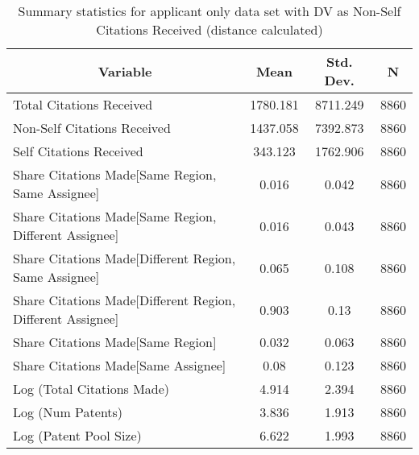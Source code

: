 
\begin{table}[htbp]\centering \caption{Summary statistics for applicant only data set with DV as Non-Self Citations Received (distance calculated) \label{a.nsummary}}
\scriptsize
\singlespacing
\begin{tabular}{l c c  c}\hline\hline
\multicolumn{1}{c}{\textbf{Variable}} & \textbf{Mean}
 & \textbf{Std. Dev.} & \textbf{N}\\ \hline
Total Citations Received & 1780.181 & 8711.249  & 8860\\
Non-Self Citations Received & 1437.058 & 7392.873  & 8860\\
Self Citations Received & 343.123 & 1762.906  & 8860\\
Share Citations Made[Same Region, Same Assignee] & 0.016 & 0.042  & 8860\\
Share Citations Made[Same Region, Different Assignee] & 0.016 & 0.043  & 8860\\
Share Citations Made[Different Region, Same Assignee] & 0.065 & 0.108  & 8860\\
Share Citations Made[Different Region, Different Assignee] & 0.903 & 0.13  & 8860\\
Share Citations Made[Same Region] & 0.032 & 0.063  & 8860\\
Share Citations Made[Same Assignee] & 0.08 & 0.123  & 8860\\
Log (Total Citations Made) & 4.914 & 2.394  & 8860\\
Log (Num Patents) & 3.836 & 1.913  & 8860\\
Log (Patent Pool Size) & 6.622 & 1.993  & 8860\\
\hline\end{tabular}
\end{table}
